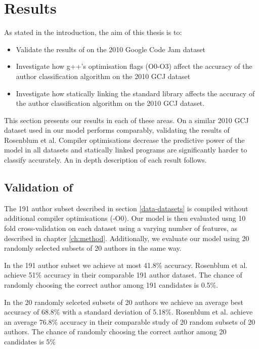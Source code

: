 \documentclass[a4paper,11pt]{kth-mag}
\begin{document}
\chapter{Results}
As stated in the introduction, the aim of this thesis is to:
\begin{itemize}
\item Validate the results of \parencite{rosenblum2011wrote} on the 2010 Google
      Code Jam dataset
\item Investigate how g++’s optimisation flags (O0-O3) affect the accuracy of
      the author classification algorithm on the 2010 GCJ dataset
\item Investigate how statically linking the standard library affects the
      accuracy of the author classification algorithm on the 2010 GCJ dataset.
\end{itemize}

This section presents our results in each of these areas. On a similar 2010 GCJ
dataset used in \parencite{rosenblum2011wrote} our model performs comparably,
validating the results of Rosenblum et al. Compiler optimisations decrease the
predictive power of the model in all datasets and statically linked programs
are significantly harder to classify accurately. An in depth description of
each result follows.

\section{Validation of \parencite{rosenblum2011wrote}}
The 191 author subset described in section \ref{data-datasets} is
compiled without additional compiler optimisations (-O0). Our model is then
evaluated usng 10 fold cross-validation on each dataset using a varying number
of features, as described in chapter \ref{ch:method}. Additionally, we evaluate
our model using 20 randomly selected subsets of 20 authors in the same way.

In the 191 author subset we achieve at most 41.8\% accuracy. Rosenblum et al.
achieve 51\% accuracy in their comparable 191 author dataset. The chance of
randomly choosing the correct author among 191 candidates is 0.5\%.

In the 20 randomly selceted subsets of 20 authors we achieve an average best
accuracy of 68.8\% with a standard deviation of 5.18\%. Rosenblum et al.
achieve an average 76.8\% accuracy in their comparable study of 20 random
subsets of 20 authors. The chance of randomly choosing the correct author
among 20 candidates is 5\%
\end{document}
